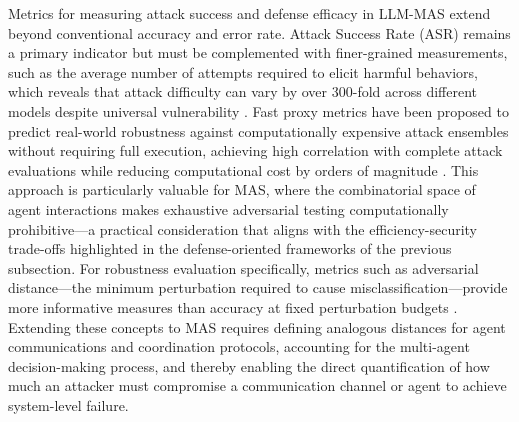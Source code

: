 \documentclass[11pt]{article}
\begin{document}
Metrics for measuring attack success and defense efficacy in LLM-MAS extend beyond conventional accuracy and error rate. Attack Success Rate (ASR) remains a primary indicator but must be complemented with finer-grained measurements, such as the average number of attempts required to elicit harmful behaviors, which reveals that attack difficulty can vary by over 300-fold across different models despite universal vulnerability \cite{ref449}. Fast proxy metrics have been proposed to predict real-world robustness against computationally expensive attack ensembles without requiring full execution, achieving high correlation with complete attack evaluations while reducing computational cost by orders of magnitude \cite{ref450}. This approach is particularly valuable for MAS, where the combinatorial space of agent interactions makes exhaustive adversarial testing computationally prohibitive---a practical consideration that aligns with the efficiency-security trade-offs highlighted in the defense-oriented frameworks of the previous subsection. For robustness evaluation specifically, metrics such as adversarial distance---the minimum perturbation required to cause misclassification---provide more informative measures than accuracy at fixed perturbation budgets \cite{ref446}. Extending these concepts to MAS requires defining analogous distances for agent communications and coordination protocols, accounting for the multi-agent decision-making process, and thereby enabling the direct quantification of how much an attacker must compromise a communication channel or agent to achieve system-level failure.
\end{document}

